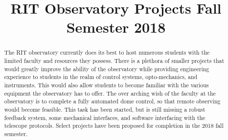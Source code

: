 \documentclass[conference]{IEEEtran} %
\title{RIT Observatory Projects Fall Semester 2018}
\author{
  \IEEEauthorblockN{%
    Amber~Dubill\IEEEauthorrefmark{1},
    Dr. Jennifer Connelly\IEEEauthorrefmark{2},
    and
    Dr. Micheal Richmond\IEEEauthorrefmark{3},
  }
  \IEEEauthorblockA{%
    RIT Space Exploration, Rochester Institute of Technology \\ %
    Rochester, N.Y. \\
    Email:
    \IEEEauthorrefmark{1}ald4035@rit.edu,
    \IEEEauthorrefmark{2}jlcsps@rit.edu,
    \IEEEauthorrefmark{3}mwrsps@rit.edu,
  }

}
\begin{document}
\maketitle%

\begin{abstract}
  The RIT observatory currently does its best to host numerous students with the limited faculty and resources they possess.
  There is a plethora of smaller projects that would greatly improve the ability of the observatory while providing engineering experience to students in the realm of control systems, opto-mechanics, and instruments.
  This would also allow students to become familiar with the various equipment the observatory has to offer.
  The over arching wish of the faculty at the observatory is to complete a fully automated dome control, so that remote observing would become feasible.
  This task has been started, but is still missing a robust feedback system, some mechanical interfaces, and software interfacing with the telescope protocols.
  Select projects have been proposed for completion in the 2018 fall semester.

\end{abstract}

\label{sec:nomenclature}
\newcommand{\nomunit}[1]{%
\renewcommand{\nomentryend}{\hspace*{\fill}#1}}
\renewcommand{\nompreamble}{

  }
\printnomenclature{}
\end{document}
